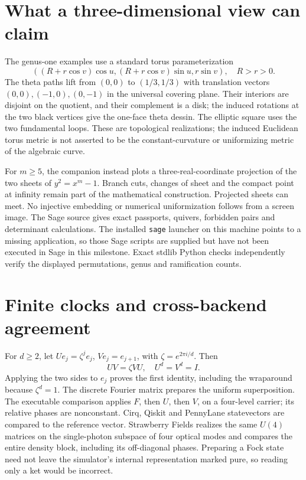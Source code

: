 \documentclass[11pt,oneside,openany]{book}
\theoremstyle{definition}\newtheorem{definition}[theorem]{Definition}
\theoremstyle{remark}\newtheorem{remark}[theorem]{Remark}
\begin{document}
\section{What a three-dimensional view can claim}
The genus-one examples use a standard torus parameterization
\[
 ((R+r\cos v)\cos u,(R+r\cos v)\sin u,r\sin v),\quad R>r>0.
\]
The theta paths lift from $(0,0)$ to $(1/3,1/3)$ with translation vectors $(0,0),(-1,0),(0,-1)$ in the universal covering plane. Their interiors are disjoint on the quotient, and their complement is a disk; the induced rotations at the two black vertices give the one-face theta dessin. The elliptic square uses the two fundamental loops. These are topological realizations; the induced Euclidean torus metric is not asserted to be the constant-curvature or uniformizing metric of the algebraic curve.

For $m\ge5$, the companion instead plots a three-real-coordinate projection of the two sheets of $y^2=x^m-1$. Branch cuts, changes of sheet and the compact point at infinity remain part of the mathematical construction. Projected sheets can meet. No injective embedding or numerical uniformization follows from a screen image. The Sage source gives exact passports, quivers, forbidden pairs and determinant calculations. The installed \texttt{sage} launcher on this machine points to a missing application, so those Sage scripts are supplied but have not been executed in Sage in this milestone. Exact stdlib Python checks independently verify the displayed permutations, genus and ramification counts.

\section{Finite clocks and cross-backend agreement}
For $d\ge2$, let $Ue_j=\zeta^j e_j$, $Ve_j=e_{j+1}$, with $\zeta=e^{2\pi i/d}$. Then
\[
 UV=\zeta VU,\quad U^d=V^d=I.
\]
Applying the two sides to $e_j$ proves the first identity, including the wraparound because $\zeta^d=1$. The discrete Fourier matrix prepares the uniform superposition. The executable comparison applies $F$, then $U$, then $V$, on a four-level carrier; its relative phases are nonconstant. Cirq, Qiskit and PennyLane statevectors are compared to the reference vector. Strawberry Fields realizes the same $U(4)$ matrices on the single-photon subspace of four optical modes and compares the entire density block, including its off-diagonal phases. Preparing a Fock state need not leave the simulator's internal representation marked pure, so reading only a ket would be incorrect.
\end{document}

